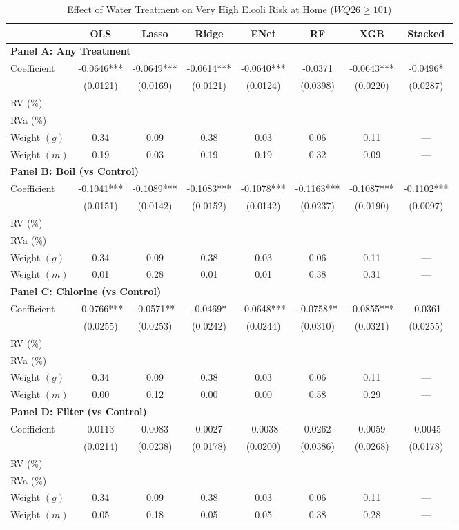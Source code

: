 \begin{table}[htbp]
\centering
\caption{Effect of Water Treatment on Very High E.coli Risk at Home ($WQ26\geq101$)}
\label{tab:very_high_risk_home_full}
\begin{tabular}{lccccccc}
\toprule
 & OLS & Lasso & Ridge & ENet & RF & XGB & Stacked \\
\midrule
\multicolumn{8}{l}{\textbf{Panel A: Any Treatment}} \\
\midrule
Coefficient & -0.0646*** & -0.0649*** & -0.0614*** & -0.0640*** & -0.0371 & -0.0643*** & -0.0496* \\
 & (0.0121) & (0.0169) & (0.0121) & (0.0124) & (0.0398) & (0.0220) & (0.0287) \\
RV (\%) \\
RVa (\%) \\
Weight $(g)$ & 0.34 & 0.09 & 0.38 & 0.03 & 0.06 & 0.11 & — \\
Weight $(m)$ & 0.19 & 0.03 & 0.19 & 0.19 & 0.32 & 0.09 & — \\

\multicolumn{8}{l}{\textbf{Panel B: Boil (vs Control)}} \\
\midrule
Coefficient & -0.1041*** & -0.1089*** & -0.1083*** & -0.1078*** & -0.1163*** & -0.1087*** & -0.1102*** \\
 & (0.0151) & (0.0142) & (0.0152) & (0.0142) & (0.0237) & (0.0190) & (0.0097) \\
RV (\%) \\
RVa (\%) \\
Weight $(g)$ & 0.34 & 0.09 & 0.38 & 0.03 & 0.06 & 0.11 & — \\
Weight $(m)$ & 0.01 & 0.28 & 0.01 & 0.01 & 0.38 & 0.31 & — \\

\multicolumn{8}{l}{\textbf{Panel C: Chlorine (vs Control)}} \\
\midrule
Coefficient & -0.0766*** & -0.0571** & -0.0469* & -0.0648*** & -0.0758** & -0.0855*** & -0.0361 \\
 & (0.0255) & (0.0253) & (0.0242) & (0.0244) & (0.0310) & (0.0321) & (0.0255) \\
RV (\%) \\
RVa (\%) \\
Weight $(g)$ & 0.34 & 0.09 & 0.38 & 0.03 & 0.06 & 0.11 & — \\
Weight $(m)$ & 0.00 & 0.12 & 0.00 & 0.00 & 0.58 & 0.29 & — \\

\multicolumn{8}{l}{\textbf{Panel D: Filter (vs Control)}} \\
\midrule
Coefficient & 0.0113 & 0.0083 & 0.0027 & -0.0038 & 0.0262 & 0.0059 & -0.0045 \\
 & (0.0214) & (0.0238) & (0.0178) & (0.0200) & (0.0386) & (0.0268) & (0.0178) \\
RV (\%) \\
RVa (\%) \\
Weight $(g)$ & 0.34 & 0.09 & 0.38 & 0.03 & 0.06 & 0.11 & — \\
Weight $(m)$ & 0.05 & 0.18 & 0.05 & 0.05 & 0.38 & 0.28 & — \\


\end{tabular}
\end{table}
